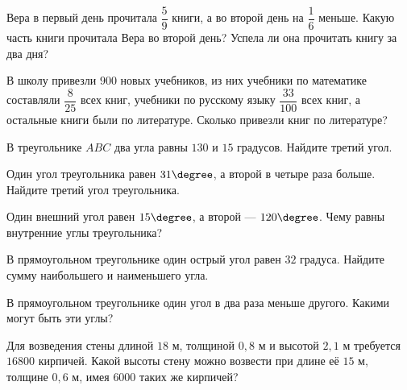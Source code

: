 \begin{class}[number=6]
	\begin{listofex}
		\item Вера в первый день прочитала \( \dfrac{5}{9} \) книги, а во второй день на \( \dfrac{1}{6} \) меньше.
		Какую часть книги прочитала Вера во второй день?
		Успела ли она прочитать книгу за два дня?
		\item В школу привезли \(900\) новых учебников, из них учебники по математике составляли \(\dfrac{8}{25}\) всех книг, учебники по русскому языку \(\dfrac{33}{100}\) всех книг, а остальные книги были по литературе. Сколько привезли книг по литературе?
		\item В треугольнике \( ABC \) два угла равны \( 130\) и \( 15 \) градусов. Найдите третий угол.
		\item Один угол треугольника равен \( 31\degree \), а второй в четыре раза больше. Найдите третий угол треугольника.
		\item Один внешний угол равен \( 15\degree \), а второй --- \( 120\degree \). Чему равны внутренние углы треугольника?
		\item В прямоугольном треугольнике один острый угол равен \( 32 \) градуса. Найдите сумму наибольшего и наименьшего угла.
		\item В прямоугольном треугольнике один угол в два раза меньше другого. Какими могут быть эти углы?
		\item Для возведения стены длиной \( 18 \) м, толщиной \( 0,8 \) м и высотой \( 2,1 \) м требуется \( 16800 \) кирпичей. Какой высоты стену можно возвести при длине её \( 15 \) м, толщине \( 0,6 \) м, имея \( 6000 \) таких же кирпичей?
	\end{listofex}
\end{class}

